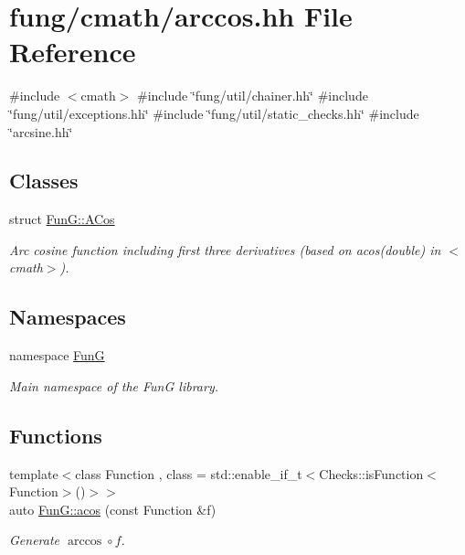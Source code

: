 \hypertarget{arccos_8hh}{\section{fung/cmath/arccos.hh \-File \-Reference}
\label{arccos_8hh}
}
{\ttfamily \#include $<$cmath$>$}\*
{\ttfamily \#include \char`\"{}fung/util/chainer.\-hh\char`\"{}}\*
{\ttfamily \#include \char`\"{}fung/util/exceptions.\-hh\char`\"{}}\*
{\ttfamily \#include \char`\"{}fung/util/static\-\_\-checks.\-hh\char`\"{}}\*
{\ttfamily \#include \char`\"{}arcsine.\-hh\char`\"{}}\*
\subsection*{\-Classes}
\begin{DoxyCompactItemize}
\item 
struct \hyperlink{structFunG_1_1ACos}{\-Fun\-G\-::\-A\-Cos}
\begin{DoxyCompactList}\small\item\em \-Arc cosine function including first three derivatives (based on acos(double) in $<$cmath$>$). \end{DoxyCompactList}\end{DoxyCompactItemize}
\subsection*{\-Namespaces}
\begin{DoxyCompactItemize}
\item 
namespace \hyperlink{namespaceFunG}{\-Fun\-G}
\begin{DoxyCompactList}\small\item\em \-Main namespace of the \-Fun\-G library. \end{DoxyCompactList}\end{DoxyCompactItemize}
\subsection*{\-Functions}
\begin{DoxyCompactItemize}
\item 
{\footnotesize template$<$class Function , class  = std\-::enable\-\_\-if\-\_\-t$<$\-Checks\-::is\-Function$<$\-Function$>$()$>$$>$ }\\auto \hyperlink{group__CMathGroup_gae9b7d3a479bcd8d48cf25f1c29edefb9}{\-Fun\-G\-::acos} (const \-Function \&f)
\begin{DoxyCompactList}\small\item\em \-Generate $ \arccos\circ f $. \end{DoxyCompactList}\end{DoxyCompactItemize}
